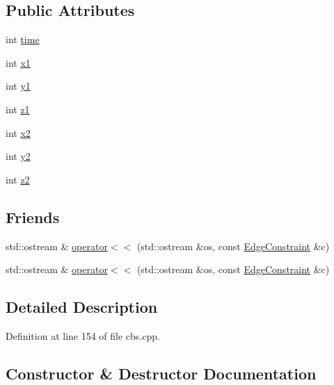 \subsection*{Public Attributes}
\begin{DoxyCompactItemize}
\item 
int \hyperlink{struct_edge_constraint_aa4a694babdcc422c4914ec768994119b}{time}
\item 
int \hyperlink{struct_edge_constraint_a71519eb54d966deeed3ac62bfabb6248}{x1}
\item 
int \hyperlink{struct_edge_constraint_ada1765ae9a023f4725d515410854efe4}{y1}
\item 
int \hyperlink{struct_edge_constraint_aef17564b45f61b8d1112b26fcb2530cc}{z1}
\item 
int \hyperlink{struct_edge_constraint_ac586d7c34a6aa83734a860390b99b011}{x2}
\item 
int \hyperlink{struct_edge_constraint_a4575744b1bc5386c9195074e73586e96}{y2}
\item 
int \hyperlink{struct_edge_constraint_a11aa005fe0bd29b4bf4da5e0429dcba6}{z2}
\end{DoxyCompactItemize}
\subsection*{Friends}
\begin{DoxyCompactItemize}
\item 
std\+::ostream \& \hyperlink{struct_edge_constraint_a94c3e6e61fef6fe98974b7bcf1b2245e}{operator$<$$<$} (std\+::ostream \&os, const \hyperlink{struct_edge_constraint}{Edge\+Constraint} \&c)
\item 
std\+::ostream \& \hyperlink{struct_edge_constraint_a94c3e6e61fef6fe98974b7bcf1b2245e}{operator$<$$<$} (std\+::ostream \&os, const \hyperlink{struct_edge_constraint}{Edge\+Constraint} \&c)
\end{DoxyCompactItemize}


\subsection{Detailed Description}


Definition at line 154 of file cbs.\+cpp.



\subsection{Constructor \& Destructor Documentation}
\mbox{\label{struct_edge_constraint_a9a9f97acb89f2086589a058d8ea10cf8}} 
